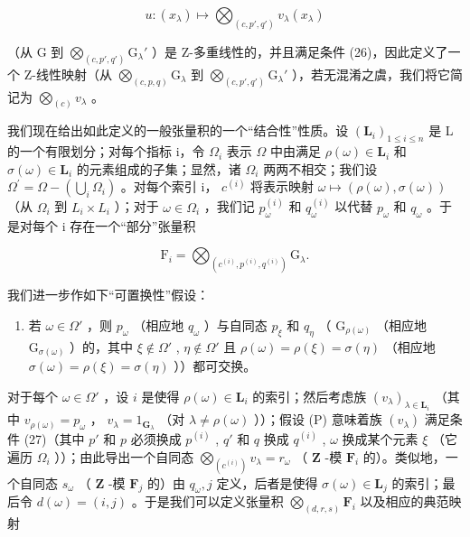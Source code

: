 \[
u: (x _ {\lambda}) \mapsto \bigotimes_ {(c, p', q')} v _ {\lambda} (x _ {\lambda})
\]

（从 G 到 \(\bigotimes_{(c, p', q')} \mathrm{G}_{\lambda}'\) ）是 Z-多重线性的，并且满足条件 (26)，因此定义了一个 Z-线性映射（从 \(\bigotimes_{(c, p, q)} \mathrm{G}_{\lambda}\) 到 \(\bigotimes_{(c, p', q')} \mathrm{G}_{\lambda}'\) ），若无混淆之虞，我们将它简记为 \(\bigotimes_{(c)} v_{\lambda}\) 。

我们现在给出如此定义的一般张量积的一个“结合性”性质。设 \((\mathbf{L}_{i})_{1\leq i\leq n}\) 是 L 的一个有限划分；对每个指标 i，令 \(\Omega_{i}\) 表示 \(\Omega\) 中由满足 \(\rho(\omega)\in\mathbf{L}_{i}\) 和 \(\sigma(\omega)\in\mathbf{L}_{i}\) 的元素组成的子集；显然，诸 \(\Omega_{i}\) 两两不相交；我们设 \(\Omega^{\prime}=\Omega-\left(\bigcup_{i}\Omega_{i}\right)\) 。对每个索引 i， \(c^{(i)}\) 将表示映射 \(\omega\mapsto(\rho(\omega),\sigma(\omega))\) （从 \(\Omega_{i}\) 到 \(L_{i}\times L_{i}\) ）；对于 \(\omega\in\Omega_{i}\) ，我们记 \(p_{\omega}^{(i)}\) 和 \(q_{\omega}^{(i)}\) 以代替 \(p_{\omega}\) 和 \(q_{\omega}\) 。于是对每个 i 存在一个“部分”张量积

\[
\mathrm{F} _ {i} = \bigotimes_ {(c ^ {(i)}, p ^ {(i)}, q ^ {(i)})} \mathrm{G} _ {\lambda}.
\]

我们进一步作如下“可置换性”假设：

\begin{enumerate}
\def\labelenumi{(\Alph{enumi})}
\setcounter{enumi}{15}
\tightlist
\item
  若 \(\omega \in \Omega'\) ，则 \(p_{\omega}\) （相应地 \(q_{\omega}\) ）与自同态 \(p_{\xi}\) 和 \(q_{\eta}\) （ \(\mathrm{G}_{\rho(\omega)}\) （相应地 \(\mathrm{G}_{\sigma(\omega)}\) ）的，其中 \(\xi \notin \Omega'\) , \(\eta \notin \Omega'\) 且 \(\rho(\omega) = \rho(\xi) = \sigma(\eta)\) （相应地 \(\sigma(\omega) = \rho(\xi) = \sigma(\eta)\) ））都可交换。
\end{enumerate}

对于每个 \(\omega \in \Omega'\) ，设 \(i\) 是使得 \(\rho(\omega) \in \mathbf{L}_i\) 的索引；然后考虑族 \((v_{\lambda})_{\lambda \in \mathbf{L}_i}\) （其中 \(v_{\rho(\omega)} = p_{\omega}\) ， \(v_{\lambda} = 1_{\mathbf{G}_{\lambda}}\) （对 \(\lambda \neq \rho(\omega)\) ））；假设 (P) 意味着族 \((v_{\lambda})\) 满足条件 (27)（其中 \(p'\) 和 \(p\) 必须换成 \(p^{(i)}\) , \(q'\) 和 \(q\) 换成 \(q^{(i)}\) , \(\omega\) 换成某个元素 \(\xi\) （它遍历 \(\Omega_i\) ））；由此导出一个自同态 \(\bigotimes_{(c^{(i)})} v_{\lambda} = r_{\omega}\) （ \(\mathbf{Z}\) -模 \(\mathbf{F}_i\) 的）。类似地，一个自同态 \(s_{\omega}\) （ \(\mathbf{Z}\) -模 \(\mathbf{F}_j\) 的）由 \(q_{\omega}, j\) 定义，后者是使得 \(\sigma(\omega) \in \mathbf{L}_j\) 的索引；最后令 \(d(\omega) = (i,j)\) 。于是我们可以定义张量积 \(\bigotimes_{(d,r,s)} \mathbf{F}_i\) 以及相应的典范映射

